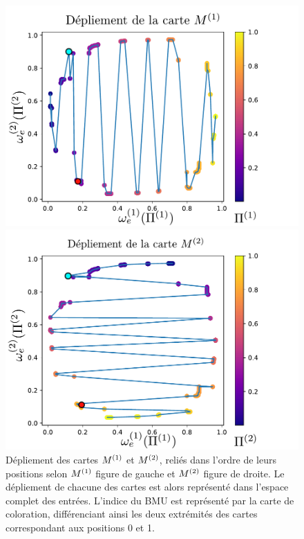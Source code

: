 \documentclass[../main]{subfiles}
\begin{document}
\begin{figure}
    \begin{minipage}{0.49\textwidth}
    \includegraphics[width=\textwidth]{disto_cercle_M1.pdf}
    \end{minipage}
    \begin{minipage}{0.49\textwidth}
    \includegraphics[width=\textwidth]{disto_cercle_M2.pdf}
    \end{minipage}
    \caption{Dépliement des cartes $M^{({1})}$ et $M^{({2})}$, reliés dans l'ordre de leurs positions selon $M^{({1})}$ figure de gauche et $M^{({2})}$ figure de droite. Le dépliement de chacune des cartes est alors représenté dans l'espace complet des entrées. L'indice du BMU est représenté par la carte de coloration, différenciant ainsi les deux extrémités des cartes correspondant aux positions 0 et 1.\label{fig:distortion}}
    \end{figure}
\end{document}
